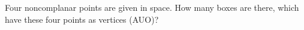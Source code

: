 Four noncomplanar points are given in space. How many boxes are there, which have these four points as vertices (AUO)?
